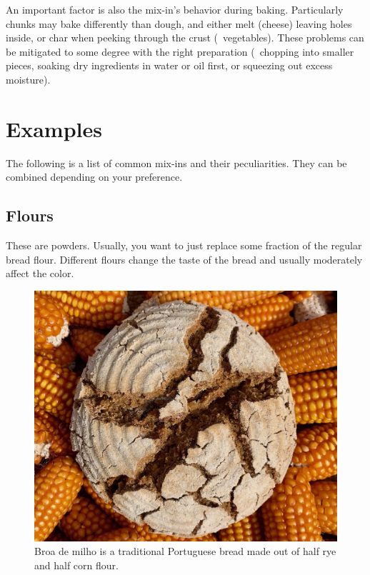 An important factor is also the mix-in's behavior during baking. Particularly
chunks may bake differently than dough, and either melt (cheese) leaving holes
inside, or char when peeking through the crust (\eg~vegetables). These
problems can be mitigated to some degree with the right preparation (\eg~chopping
into smaller pieces, soaking dry ingredients in water or oil first,
or squeezing out excess moisture).

\section{Examples}

The following is a list of common mix-ins and their peculiarities. They can be
combined depending on your preference.

\subsection{Flours}
These are powders. Usually, you want to just replace some fraction of the
regular bread flour. Different flours change the taste of the bread and
usually moderately affect the color.

\begin{figure}[htb!]
  \includegraphics[width=\textwidth]{broa}
  \caption[Broa de milho]{Broa de milho is a traditional Portuguese bread
  made out of half rye and half corn flour.}%
\end{figure}

